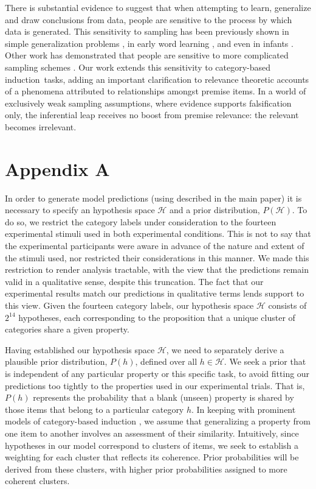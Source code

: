 \documentclass[doc,12pt]{apa}
\newcommand{\cbi}{category-based induction}
\newcommand{\bigh}{\mathcal{H}}
\begin{document}
%
There is substantial evidence to suggest that when attempting to learn, generalize and draw conclusions from data, people are sensitive to the process by which data is generated. This sensitivity to sampling has been previously shown in simple generalization problems \cite{TG01,NDL12}, in early word learning \cite{XT07}, and even in infants \cite{GHT10}. Other work has demonstrated that people are sensitive to more complicated sampling schemes \cite{SGG14}.
Our work extends this sensitivity to \cbi\ tasks, adding an important clarification to relevance theoretic accounts of a phenomena attributed to relationships amongst premise items. In a world of exclusively weak sampling assumptions, where evidence supports falsification only, the inferential leap receives no boost from premise relevance: the relevant becomes irrelevant.

\section{Appendix A}
\label{sec:derivingpriors}

In order to generate model predictions (using  described in the main paper) it is necessary to specify an hypothesis space $\bigh$ and a prior distribution, $P(\bigh)$. To do so, we restrict the category labels under consideration to the fourteen experimental stimuli used in both experimental conditions. This is not to say that the experimental participants were aware in advance of the nature and extent of the stimuli used, nor restricted their considerations in this manner. We made this restriction to render analysis tractable, with the view that the predictions remain valid in a qualitative sense, despite this truncation. The fact that our experimental results match our predictions in qualitative terms lends support to this view. Given the fourteen category labels, our hypothesis space $\bigh$ consists of $2^{14}$ hypotheses, each corresponding to the proposition that a unique cluster of categories share a given property.

Having established our hypothesis space $\bigh$, we need to separately derive a plausible prior distribution, $P(h)$, defined over all $h \in \bigh$. We seek a prior that is independent of any particular property or this specific task, to avoid fitting our predictions too tightly to the properties used in our experimental trials. That is, $P(h)$ represents the probability that a blank (unseen) property is shared by those items that belong to a particular category $h$. In keeping with prominent models of category-based induction \cite{Osh90, Slo93}, we assume that generalizing a property from one item to another involves an assessment of their similarity. Intuitively, since hypotheses in our model correspond to clusters of items, we seek to establish a weighting for each cluster that reflects its coherence. Prior probabilities will be derived from these clusters, with higher prior probabilities assigned to more coherent clusters.
\end{document}
